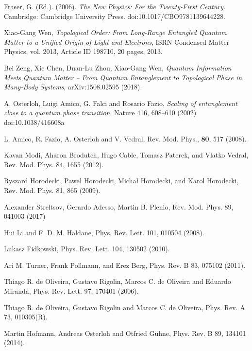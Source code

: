 \documentclass[prb,reprint,showpacs,twocolumn,superscriptaddress]{revtex4-2}
\begin{document}
\begin{thebibliography}{99}

 Fraser, G. (Ed.). (2006). \textit{The New Physics: For the Twenty-First Century}. Cambridge: Cambridge University Press. doi:10.1017/CBO9781139644228.

 Xiao-Gang Wen, \textit{Topological Order: From Long-Range Entangled Quantum Matter to a Unified Origin of Light and Electrons}, ISRN Condensed Matter Physics, vol. 2013, Article ID 198710, 20 pages, 2013. 

 Bei Zeng, Xie Chen, Duan-Lu Zhou, Xiao-Gang Wen, \textit{Quantum Information Meets Quantum Matter -- From Quantum Entanglement to Topological Phase in Many-Body Systems}, arXiv:1508.02595 (2018).

 A. Osterloh, Luigi Amico, G. Falci and Rosario Fazio, \textit{Scaling of entanglement close to a quantum phase transition}. Nature 416, 608–610 (2002) doi:10.1038/416608a

 L. Amico, R. Fazio, A. Osterloh and V. Vedral,
 Rev. Mod. Phys., 
\textbf{80}, 517 (2008).

 Kavan Modi, Aharon Brodutch, Hugo Cable, Tomasz Paterek, and Vlatko Vedral, Rev. Mod. Phys. 84, 1655 (2012).


 Ryszard Horodecki, Paweł Horodecki, Michał Horodecki, and Karol Horodecki, Rev. Mod. Phys. 81, 865 (2009).

 Alexander Streltsov, Gerardo Adesso, Martin B. Plenio, Rev. Mod. Phys. 89, 041003 (2017)

 Hui Li and F. D. M. Haldane,
Phys. Rev. Lett. 101, 010504 (2008).

 Lukasz Fidkowski,
Phys. Rev. Lett. 104, 130502 (2010).

 Ari M. Turner, Frank Pollmann, and Erez Berg, Phys. Rev. B 83, 075102 (2011).


 Thiago R. de Oliveira, Gustavo Rigolin, Marcos C. de Oliveira and Eduardo Miranda, Phys. Rev. Lett. 97, 170401 (2006).

 Thiago R. de Oliveira, Gustavo Rigolin and Marcos C. de Oliveira, 
Phys. Rev. A 73, 010305(R).

 Martin Hofmann, Andreas Osterloh and Otfried Gühne, Phys. Rev. B 89, 134101 (2014).


\end{thebibliography}
\end{document}
